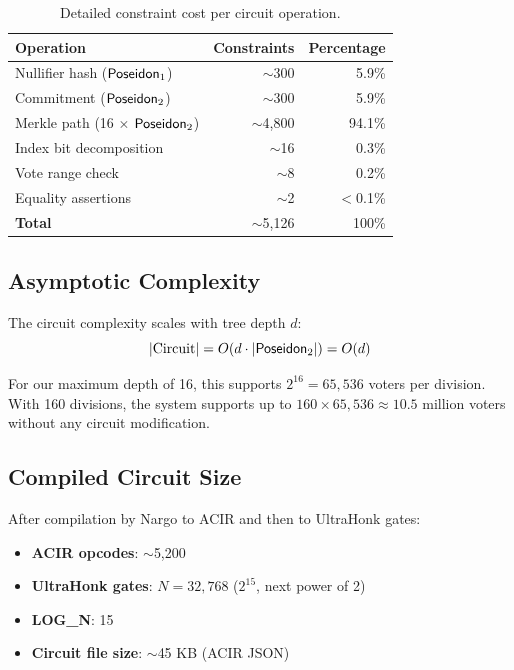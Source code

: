 \begin{table}[H]
\centering
\caption{Detailed constraint cost per circuit operation.}
\label{tab:constraint-costs}
\begin{tabular}{|l|r|r|}
\hline
\textbf{Operation} & \textbf{Constraints} & \textbf{Percentage} \\
\hline
Nullifier hash ($\mathsf{Poseidon}_1$) & $\sim$300 & 5.9\% \\
\hline
Commitment ($\mathsf{Poseidon}_2$) & $\sim$300 & 5.9\% \\
\hline
Merkle path (16 $\times$ $\mathsf{Poseidon}_2$) & $\sim$4,800 & 94.1\% \\
\hline
Index bit decomposition & $\sim$16 & 0.3\% \\
\hline
Vote range check & $\sim$8 & 0.2\% \\
\hline
Equality assertions & $\sim$2 & $<$0.1\% \\
\hline
\textbf{Total} & $\sim$5,126 & 100\% \\
\hline
\end{tabular}
\end{table}

\subsection{Asymptotic Complexity}

The circuit complexity scales with tree depth $d$:
\begin{equation}
|\text{Circuit}| = O(d \cdot |\mathsf{Poseidon}_2|) = O(d)
\end{equation}

For our maximum depth of 16, this supports $2^{16} = 65,536$ voters per division. With 160 divisions, the system supports up to $160 \times 65,536 \approx 10.5$ million voters without any circuit modification.

\subsection{Compiled Circuit Size}

After compilation by Nargo to ACIR and then to UltraHonk gates:
\begin{itemize}
    \item \textbf{ACIR opcodes}: $\sim$5,200
    \item \textbf{UltraHonk gates}: $N = 32,768$ ($2^{15}$, next power of 2)
    \item \textbf{LOG\_N}: 15
    \item \textbf{Circuit file size}: $\sim$45 KB (ACIR JSON)
\end{itemize}

